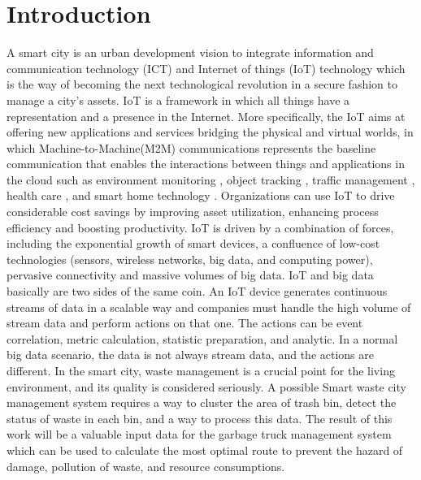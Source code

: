 \documentclass[conference,compsoc]{IEEEtran}
\begin{document}
\section{Introduction}
A smart city is an urban development vision to integrate information and communication technology (ICT) and Internet of things (IoT) technology which is the way of becoming the next technological revolution \cite{Delicato2013} in a secure fashion to manage a city's assets. IoT is a framework in which all things have a representation and a presence in the Internet. More specifically, the IoT aims at offering new applications and services bridging the physical and virtual worlds, in which Machine-to-Machine(M2M) communications represents the baseline communication that enables the interactions between things and applications in the cloud such as environment monitoring \cite{Lazarescu2013}\cite{Kelly2013}, object tracking \cite{Gama2012}, traffic management \cite{Foschini2011}, health care \cite{Jara2011}, and smart home technology \cite{Tozlu2012}\cite{Li2011}. Organizations can use IoT to drive considerable cost savings by improving asset utilization, enhancing process efficiency and boosting productivity. IoT is driven by a combination of forces, including the exponential growth of smart devices, a confluence of low-cost technologies (sensors, wireless networks, big data, and computing power), pervasive connectivity and massive volumes of big data. IoT and big data basically are two sides of the same coin. An IoT device generates continuous streams of data in a scalable way and companies must handle the high volume of stream data and perform actions on that one. The actions can be event correlation, metric calculation, statistic preparation, and analytic. In a normal big data scenario, the data is not always stream data, and the actions are different. In the smart city, waste management is a crucial point for the living environment, and its quality is considered seriously. A possible Smart waste city management system requires a way to cluster the area of trash bin, detect the status of waste in each bin, and a way to process this data. The result of this work will be a valuable input data for the garbage truck  management system which can be used to calculate the most optimal route to prevent the hazard of damage, pollution of waste, and resource consumptions.
\end{document}
